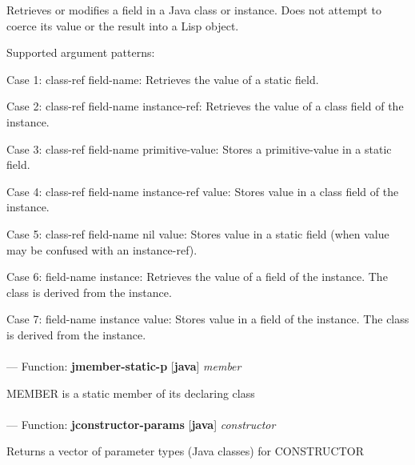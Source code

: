 \begin{adjustwidth}{5em}{5em}
Retrieves or modifies a field in a Java class or instance. Does not
attempt to coerce its value or the result into a Lisp object.

Supported argument patterns:

   Case 1: class-ref  field-name:
      Retrieves the value of a static field.

   Case 2: class-ref  field-name  instance-ref:
      Retrieves the value of a class field of the instance.

   Case 3: class-ref  field-name  primitive-value:
      Stores a primitive-value in a static field.

   Case 4: class-ref  field-name  instance-ref  value:
      Stores value in a class field of the instance.

   Case 5: class-ref  field-name  nil  value:
      Stores value in a static field (when value may be
      confused with an instance-ref).

   Case 6: field-name  instance:
      Retrieves the value of a field of the instance. The
      class is derived from the instance.

   Case 7: field-name  instance  value:
      Stores value in a field of the instance. The class is
      derived from the instance.


\end{adjustwidth}

\paragraph{}
\label{JAVA:JMEMBER-STATIC-P}
--- Function: \textbf{jmember-static-p} [\textbf{java}] \textit{member}

\begin{adjustwidth}{5em}{5em}
MEMBER is a static member of its declaring class
\end{adjustwidth}

\paragraph{}
\label{JAVA:JCONSTRUCTOR-PARAMS}
--- Function: \textbf{jconstructor-params} [\textbf{java}] \textit{constructor}

\begin{adjustwidth}{5em}{5em}
Returns a vector of parameter types (Java classes) for CONSTRUCTOR
\end{adjustwidth}


